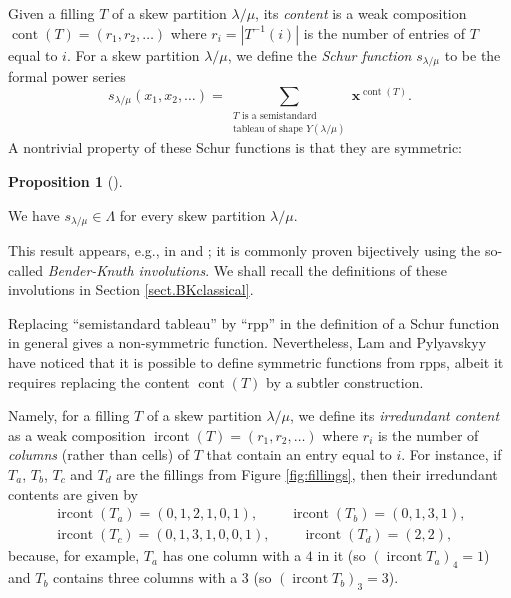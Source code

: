 \documentclass[numbers=enddot,12pt,final,onecolumn,notitlepage]{scrartcl}%
\theoremstyle{definition}
\newtheorem{prop}[theo]{Proposition}
\newenvironment{proposition}[1][]
{\begin{prop}[#1]\begin{leftbar}}
{\end{leftbar}\end{prop}}
\let\sumnonlimits\sum
\renewcommand{\sum}{\sumnonlimits\limits}
\def\ircont{{\operatorname*{ircont}}}
\def\lm{{\lambda/\mu}}
\begin{document}
 Given a filling $T$ of a skew partition $\lm$, its \textit{content} is a weak composition $\operatorname*{cont}\left(  T\right)=\left(r_1,r_2,\dots\right)$ where $r_i=\left|T^{-1}(i)\right|$ is the number of entries of $T$ equal to $i$. For a skew partition $\lambda/\mu$, we define the \textit{Schur function}
$s_{\lambda/\mu}$ to be the formal power series 
\[
s_\lm(x_1,x_2,\dots)
= \sum_{\substack{T\text{ is a semistandard}\\\text{tableau of shape }Y\left(  \lambda/\mu\right)}}
\mathbf{x}^{\operatorname*{cont}\left(  T\right)  }.
\]
A nontrivial property
of these Schur functions is that they are symmetric:

 
\begin{proposition}
\label{prop.schur.symm}We have $s_{\lambda/\mu}\in\Lambda$ for every skew
partition $\lambda/\mu$.
\end{proposition}

This result appears, e.g., in \cite[Theorem 7.10.2]{Stan99} and
\cite[Proposition 2.11]{GriRei15}; it is commonly proven bijectively using the
so-called \textit{Bender-Knuth involutions}. We shall recall the definitions
of these involutions in Section \ref{sect.BKclassical}.


 Replacing ``semistandard
tableau'' by ``rpp'' in the
definition of a Schur function in general gives a non-symmetric function. Nevertheless, Lam
and Pylyavskyy \cite[\S 9]{LamPyl} have noticed that it is possible to define
symmetric functions from rpps, albeit it requires replacing the content
$\operatorname*{cont}\left(  T\right)  $ by a subtler construction.



  Namely, for a filling $T$ of a skew partition $\lm$, we define its \textit{irredundant content} as a weak composition $\operatorname*{ircont}\left(
T\right) = \left(r_1,r_2,\dots\right)$ where $r_i$ is the number of \emph{columns} (rather than cells) of $T$ that contain an entry equal to $i$. For instance, if $T_a$, $T_b$, $T_c$ and $T_d$ are the fillings from Figure \ref{fig:fillings}, then their irredundant contents are given by
\begin{align*}
\ircont(T_a)=(0,1,2,1,0,1),\ \qquad \ircont(T_b)=(0,1,3,1), \\
\ircont(T_c)=(0,1,3,1,0,0,1),\ \qquad \ircont(T_d)=(2,2),
\end{align*}
because, for example, $T_a$ has one column with a $4$ in it (so $(\ircont{T_a})_4=1$) and $T_b$ contains three columns with a $3$ (so $(\ircont{T_b})_3=3$).
\end{document}

